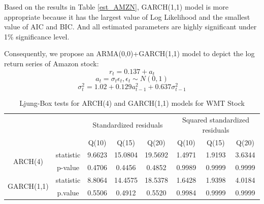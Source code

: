 \documentclass[paper=a4, fontsize=11pt]{article}
\begin{document}
Based on the results in Table \ref{est_AMZN}, GARCH(1,1) model is more appropriate because it has the largest value of Log Likelihood and the smallest value of AIC and BIC. And all estimated parameters are highly significant under 1\% significance level.

Consequently, we propose an ARMA(0,0)+GARCH(1,1) model to depict the log return series of Amazon stock:
\[ r_t = 0.137+a_t\]
\[ a_t = \sigma_t \epsilon_t, \epsilon_t \sim N(0,1) \]
\[ \sigma_t^2 = 1.02+0.129a_{t-1}^2+0.637\sigma_{t-1}^2 \]

\begin{table}[!htbp] \centering 
  \caption{Ljung-Box tests for ARCH(4) and GARCH(1,1) models for WMT Stock} 
  \label{lb_WMT} 
\begin{tabular}{cc|cccccc} 
\\[-1.8ex]\hline 
\hline
& & \multicolumn{3}{c}{Standardized residuals} & \multicolumn{3}{c}{Squared standardized residuals} \\
& & Q(10) & Q(15) & Q(20) & Q(10) & Q(15) & Q(20) \\
\hline 
\multirow{2}{*}{ARCH(4)} & statistic & 9.6623 & 15.0804 & 19.5692 & 1.4971 & 1.9193 & 3.6344 \\
& p-value & 0.4706 & 0.4456 & 0.4852 & 0.9989 & 0.9999 & 0.9999 \\
\multirow{2}{*}{GARCH(1,1)} & statistic & 8.8064 & 14.4575 & 18.5378 & 1.6428 & 1.9398 & 4.0184 \\
& p.value & 0.5506 & 0.4912 & 0.5520 & 0.9984 & 0.9999 & 0.9999 \\
\hline
\hline 
\end{tabular} 
\end{table} 
\end{document}
